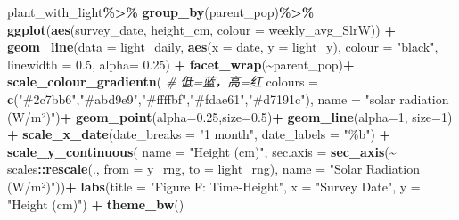 \documentclass[
]{article}
\newenvironment{Shaded}{\begin{snugshade}}{\end{snugshade}}
\newcommand{\AttributeTok}[1]{\textcolor[rgb]{0.13,0.29,0.53}{#1}}
\newcommand{\CommentTok}[1]{\textcolor[rgb]{0.56,0.35,0.01}{\textit{#1}}}
\newcommand{\DecValTok}[1]{\textcolor[rgb]{0.00,0.00,0.81}{#1}}
\newcommand{\FloatTok}[1]{\textcolor[rgb]{0.00,0.00,0.81}{#1}}
\newcommand{\FunctionTok}[1]{\textcolor[rgb]{0.13,0.29,0.53}{\textbf{#1}}}
\newcommand{\NormalTok}[1]{#1}
\newcommand{\SpecialCharTok}[1]{\textcolor[rgb]{0.81,0.36,0.00}{\textbf{#1}}}
\newcommand{\StringTok}[1]{\textcolor[rgb]{0.31,0.60,0.02}{#1}}
\begin{document}
\begin{Shaded}
\begin{Highlighting}[]
\NormalTok{plant\_with\_light}\SpecialCharTok{\%\textgreater{}\%}
  \FunctionTok{group\_by}\NormalTok{(parent\_pop)}\SpecialCharTok{\%\textgreater{}\%}
  \FunctionTok{ggplot}\NormalTok{(}\FunctionTok{aes}\NormalTok{(survey\_date, height\_cm, }\AttributeTok{colour =}\NormalTok{ weekly\_avg\_SlrW)) }\SpecialCharTok{+}
  \FunctionTok{geom\_line}\NormalTok{(}\AttributeTok{data =}\NormalTok{ light\_daily,}
            \FunctionTok{aes}\NormalTok{(}\AttributeTok{x =}\NormalTok{ date, }\AttributeTok{y =}\NormalTok{ light\_y),}
            \AttributeTok{colour =} \StringTok{"black"}\NormalTok{, }\AttributeTok{linewidth =} \FloatTok{0.5}\NormalTok{, }\AttributeTok{alpha=} \FloatTok{0.25}\NormalTok{) }\SpecialCharTok{+}
  \FunctionTok{facet\_wrap}\NormalTok{(}\SpecialCharTok{\textasciitilde{}}\NormalTok{parent\_pop)}\SpecialCharTok{+}
  \FunctionTok{scale\_colour\_gradientn}\NormalTok{(                         }\CommentTok{\# 低=蓝，高=红}
    \AttributeTok{colours =} \FunctionTok{c}\NormalTok{(}\StringTok{"\#2c7bb6"}\NormalTok{,}\StringTok{"\#abd9e9"}\NormalTok{,}\StringTok{"\#ffffbf"}\NormalTok{,}\StringTok{"\#fdae61"}\NormalTok{,}\StringTok{"\#d7191c"}\NormalTok{),}
    \AttributeTok{name =} \StringTok{"solar radiation (W/m²)"}\NormalTok{)}\SpecialCharTok{+}
  \FunctionTok{geom\_point}\NormalTok{(}\AttributeTok{alpha=}\FloatTok{0.25}\NormalTok{,}\AttributeTok{size=}\FloatTok{0.5}\NormalTok{)}\SpecialCharTok{+}
  \FunctionTok{geom\_line}\NormalTok{(}\AttributeTok{alpha=}\DecValTok{1}\NormalTok{, }\AttributeTok{size=}\DecValTok{1}\NormalTok{) }\SpecialCharTok{+}
  \FunctionTok{scale\_x\_date}\NormalTok{(}\AttributeTok{date\_breaks =} \StringTok{"1 month"}\NormalTok{, }\AttributeTok{date\_labels =} \StringTok{"\%b"}\NormalTok{) }\SpecialCharTok{+}
   \FunctionTok{scale\_y\_continuous}\NormalTok{(}
    \AttributeTok{name =} \StringTok{"Height (cm)"}\NormalTok{,}
    \AttributeTok{sec.axis =} \FunctionTok{sec\_axis}\NormalTok{(}\SpecialCharTok{\textasciitilde{}}\NormalTok{ scales}\SpecialCharTok{::}\FunctionTok{rescale}\NormalTok{(., }\AttributeTok{from =}\NormalTok{ y\_rng, }\AttributeTok{to =}\NormalTok{ light\_rng),}
                        \AttributeTok{name =} \StringTok{"Solar Radiation (W/m²)"}\NormalTok{))}\SpecialCharTok{+}
  \FunctionTok{labs}\NormalTok{(}\AttributeTok{title =} \StringTok{"Figure F: Time{-}Height"}\NormalTok{,}
       \AttributeTok{x =} \StringTok{"Survey Date"}\NormalTok{,}
       \AttributeTok{y =} \StringTok{"Height (cm)"}\NormalTok{) }\SpecialCharTok{+}
  \FunctionTok{theme\_bw}\NormalTok{()}
\end{Highlighting}
\end{Shaded}
\end{document}
